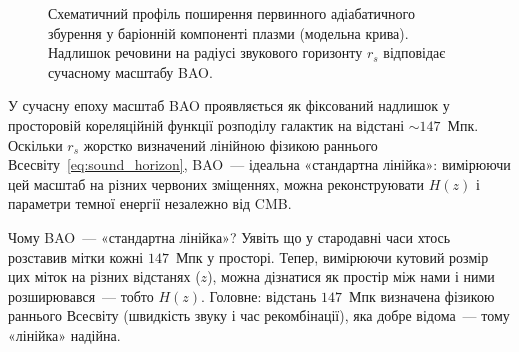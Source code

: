 \begin{figure}[ht!]
\centering
{}
\caption{Схематичний профіль поширення первинного
  адіабатичного збурення у баріонній компоненті плазми
  (модельна крива). Надлишок речовини на радіусі
  звукового горизонту $r_s$ відповідає сучасному
  масштабу BAO.}
\label{fig:bao_profile}
\end{figure}

У сучасну епоху масштаб BAO проявляється як фіксований
надлишок у просторовій кореляційній функції розподілу
галактик на відстані $\sim 147$~Мпк. Оскільки $r_s$
жорстко визначений лінійною фізикою раннього
Всесвіту~\eqref{eq:sound_horizon}, BAO~--- ідеальна
«стандартна лінійка»: вимірюючи цей масштаб на різних
червоних зміщеннях, можна реконструювати $H(z)$ і
параметри темної енергії незалежно від CMB.

\begin{keybox}{Чому BAO~--- «стандартна лінійка»?}
Уявіть що у стародавні часи хтось розставив мітки
кожні $147$~Мпк у просторі. Тепер, вимірюючи кутовий
розмір цих міток на різних відстанях ($z$), можна
дізнатися як простір між нами і ними розширювався~---
тобто $H(z)$. Головне: відстань $147$~Мпк визначена
фізикою раннього Всесвіту (швидкість звуку і час
рекомбінації), яка добре відома~--- тому «лінійка» надійна.
\end{keybox}

